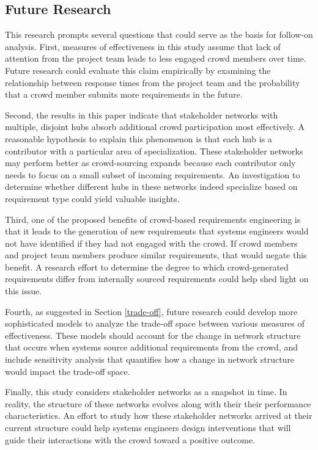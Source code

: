 \subsection{Future Research}

This research prompts several questions that could serve as the basis for follow-on analysis. First, measures of effectiveness in this study assume that lack of attention from the project team leads to less engaged crowd members over time. Future research could evaluate this claim empirically by examining the relationship between response times from the project team and the probability that a crowd member submits more requirements in the future.

Second, the results in this paper indicate that stakeholder networks with multiple, disjoint hubs absorb additional crowd participation most effectively. A reasonable hypothesis to explain this phenomenon is that each hub is a contributor with a particular area of specialization. These stakeholder networks may perform better as crowd-sourcing expands because each contributor only needs to focus on a small subset of incoming requirements. An investigation to determine whether different hubs in these networks indeed specialize based on requirement type could yield valuable insights.

Third, one of the proposed benefits of crowd-based requirements engineering is that it leads to the generation of new requirements that systems engineers would not have identified if they had not engaged with the crowd. If crowd members and project team members produce similar requirements, that would negate this benefit. A research effort to determine the degree to which crowd-generated requirements differ from internally sourced requirements could help shed light on this issue.

Fourth, as suggested in Section \ref{trade-off}, future research could develop more sophisticated models to analyze the trade-off space between various measures of effectiveness. These models should account for the change in network structure that occurs when systems source additional requirements from the crowd, and include sensitivity analysis that quantifies how a change in network structure would impact the trade-off space.

Finally, this study considers stakeholder networks as a snapshot in time. In reality, the structure of these networks evolves along with their their performance characteristics. An effort to study how these stakeholder networks arrived at their current structure could help systems engineers design interventions that will guide their interactions with the crowd toward a positive outcome.

